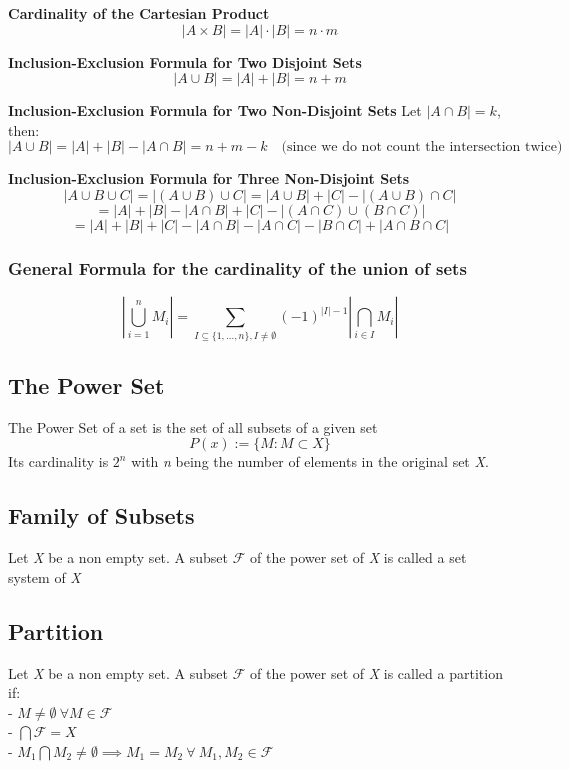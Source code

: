 \textbf{Cardinality of the Cartesian Product}
\[
	|A \times B| = |A| \cdot |B| = n \cdot m
\]

\textbf{Inclusion-Exclusion Formula for Two Disjoint Sets}
\[
	|A \cup B| = |A| + |B| = n + m
\]

\textbf{Inclusion-Exclusion Formula for Two Non-Disjoint Sets}
Let \( |A \cap B| = k \), then:
\[
	|A \cup B| = |A| + |B| - |A \cap B| = n + m - k \quad \text{(since we do not count the intersection twice)}
\]

\textbf{Inclusion-Exclusion Formula for Three Non-Disjoint Sets}
\[
	|A \cup B \cup C| = |(A \cup B) \cup C| = |A \cup B| + |C| - |(A \cup B) \cap C|
\]
\[
	= |A| + |B| - |A \cap B| + |C| - |(A \cap C) \cup (B \cap C)|
\]
\[
	= |A| + |B| + |C| - |A \cap B| - |A \cap C| - |B \cap C| + |A \cap B \cap C|
\]

\subsubsection{General Formula for the cardinality of the union of sets}

\[
	\left\vert \bigcup_{i = 1}^n M_i \right\vert  = \sum_{I \subseteq \{1, \dots, n\}, I \neq \emptyset}(-1)^{|I| - 1} \left\vert \bigcap_{i \in I} M_i \right\vert
\]

\subsection{The Power Set}
The Power Set of a set is the set of all subsets of a given set \[
	P(x):= \{ M: M \subset X\}
\]
Its cardinality is \(2^n\) with \textit{n} being the number of elements in the original set \textit{X}.

\subsection{Family of Subsets}
Let \textit{X} be a non empty set. A subset \(\mathscr{F}\) of the power set of \textit{X} is called a set system of \textit{X}

\subsection{Partition}
Let \textit{X} be a non empty set. A subset \(\mathscr{F}\) of the power set of \textit{X} is called a partition if:\\
- \(M \neq  \emptyset\ \forall M \in \mathscr{F}\)\\
- \(\bigcap \mathscr{F} = X\)\\
- \(M_1 \bigcap M_2 \ne \emptyset \implies M_1 = M_2\ \forall\ M_1, M_2 \in \mathscr{F} \)

